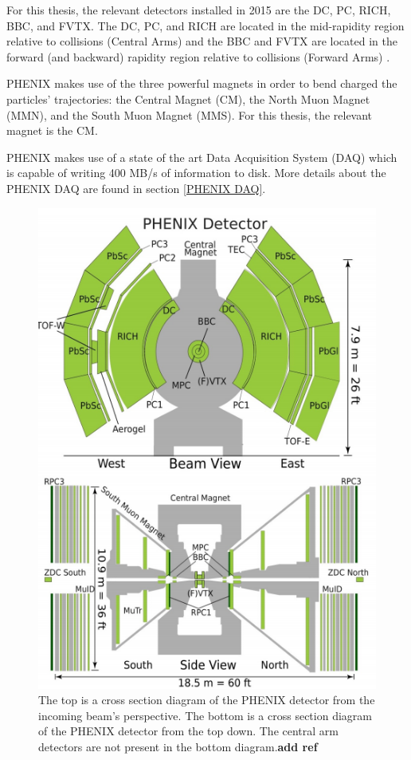 For this thesis, the relevant detectors installed in 2015 are the DC, PC, RICH, BBC, and FVTX. The DC, PC, and RICH are located in the mid-rapidity region relative to collisions (Central Arms) and the BBC and FVTX are located in the forward (and backward) rapidity region relative to collisions (Forward Arms) \cite{Adcox2003469}. 

PHENIX makes use of the three powerful magnets in order to bend charged the particles' trajectories: the Central Magnet (CM), the North Muon Magnet (MMN), and the South Muon Magnet (MMS). For this thesis, the relevant magnet is the CM. 

PHENIX makes use of a state of the art Data Acquisition System (DAQ) which is capable of writing 400 MB/s of information to disk. More details about the PHENIX DAQ are found in section \ref{PHENIX DAQ}.
\begin{figure}[!h]
\begin{center}
\includegraphics[width=0.5\linewidth]{figs/phenix_schematic.png}
\caption{The top is a cross section diagram of the PHENIX detector from the incoming beam's perspective. The bottom is a cross section diagram of the PHENIX detector from the top down. The central arm detectors are not present in the bottom diagram.\textbf{add ref}}
\label{fig:phenix_schematic}
\end{center}
\end{figure}


